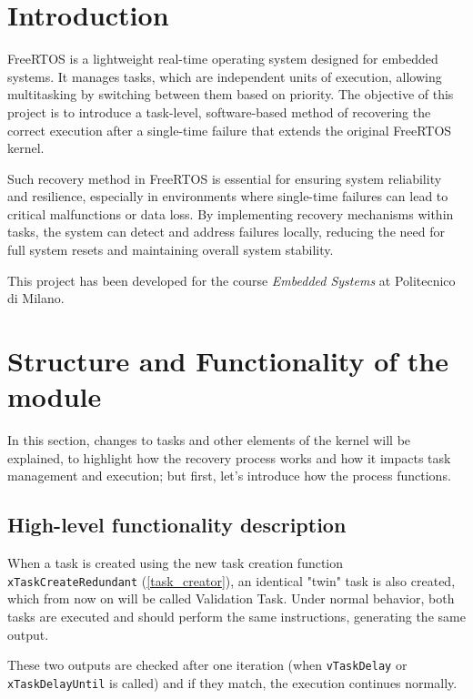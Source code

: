 \documentclass[a4paper, 12pt]{article}
\begin{document}
\newpage
\tableofcontents
\newpage
\begin{onehalfspace}

\section{Introduction}
FreeRTOS is a lightweight real-time operating system designed for embedded systems. It manages tasks, which are independent units of execution, allowing multitasking by switching between them based on priority.
The objective of this project is to introduce a task-level, software-based method of recovering the correct execution after a single-time failure that extends the original FreeRTOS kernel.

Such recovery method in FreeRTOS is essential for ensuring system reliability and resilience, especially in environments where single-time failures can lead to critical malfunctions or data loss. By implementing recovery mechanisms within tasks, the system can detect and address failures locally, reducing the need for full system resets and maintaining overall system stability.

This project has been developed for the course \textit{Embedded Systems} at Politecnico di Milano.


\section{Structure and Functionality of the module}\label{section:how_does_it_works}
 In this section, changes to tasks and other elements of the kernel will be explained, to highlight how the recovery process works and how it impacts task management and execution; but first, let’s introduce how the process functions.
\subsection {High-level functionality description}
When a task is created using the new task creation function \texttt{xTaskCreateRedundant} (\ref{task_creator}), an identical "twin" task is also created, which from now on will be called Validation Task. Under normal behavior, both tasks are executed and should perform the same instructions, generating the same output.

These two outputs are checked after one iteration (when \texttt{vTaskDelay} or \texttt{xTaskDelayUntil} is called) and if they match, the execution continues normally. 


\end{onehalfspace}
\end{document}
